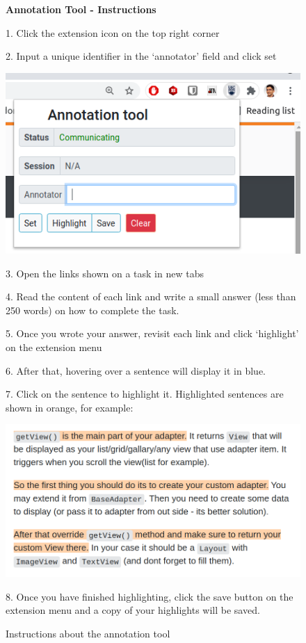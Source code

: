 

\begin{figure}
\begin{mdframed}[backgroundcolor=gray!05] 
\begin{scriptsize}

{\large \textbf{Annotation Tool - Instructions}} \bigskip


1. Click the extension icon on the top right corner \smallskip

2. Input a unique identifier in the `annotator' field and click set \smallskip


\begin{center}
    \includegraphics[width=.45\textwidth]{appendix/cp4/fig/annotation-tool.png} \smallskip
\end{center}

3. Open the links shown on a task in new tabs \smallskip

4. Read the content of each link and write a small answer (less than 250 words) on how to complete the task. \smallskip

5. Once you wrote your answer, revisit each link and click `highlight' on the extension menu \smallskip

6. After that, hovering over a sentence will display it in blue. \smallskip


7. Click on the sentence to highlight it. Highlighted sentences are shown in orange, for example: \smallskip


\begin{center}
    \includegraphics[width=.65\textwidth]{appendix/cp4/fig/highlight-orange.png} \smallskip
\end{center}


8. Once you have finished highlighting, click the save button on the extension menu and a copy of your highlights will be saved.

\end{scriptsize}
\end{mdframed}
\caption{Instructions about the annotation tool}
\end{figure}

